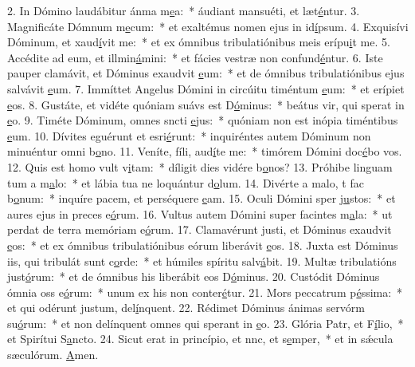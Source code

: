 2. In Dómino laudábitur ánma m\uline{e}a:~* áudiant mansuéti, et læt\uline{é}ntur.
3. Magnificáte Dómnum m\uline{e}cum:~* et exaltémus nomen ejus in id\uline{í}psum.
4. Exquisívi Dóminum, et xaud\uline{í}vit me:~* et ex ómnibus tribulatiónibus meis erípu\uline{i}t me.
5. Accédite ad eum, et illmin\uline{á}mini:~* et fácies vestræ non confund\uline{é}ntur.
6. Iste pauper clamávit, et Dóminus exaudvit \uline{e}um:~* et de ómnibus tribulatiónibus ejus salvávit \uline{e}um.
7. Immíttet Angelus Dómini in circúitu timéntum \uline{e}um:~* et erípiet \uline{e}os.
8. Gustáte, et vidéte quóniam suávs est D\uline{ó}minus:~* beátus vir, qui sperat in \uline{e}o.
9. Timéte Dóminum, omnes sncti \uline{e}jus:~* quóniam non est inópia timéntibus \uline{e}um.
10. Dívites eguérunt et esri\uline{é}runt:~* inquiréntes autem Dóminum non minuéntur omni b\uline{o}no.
11. Veníte, fíli, aud\uline{í}te me:~* timórem Dómini doc\uline{é}bo vos.
12. Quis est homo  vult v\uline{i}tam:~* díligit dies vidére b\uline{o}nos?
13. Próhibe linguam tum a m\uline{a}lo:~* et lábia tua ne loquántur d\uline{o}lum.
14. Divérte a malo, t fac b\uline{o}num:~* inquíre pacem, et perséquere \uline{e}am.
15. Oculi Dómini sper j\uline{u}stos:~* et aures ejus in preces e\uline{ó}rum.
16. Vultus autem Dómini super facintes m\uline{a}la:~* ut perdat de terra memóriam e\uline{ó}rum.
17. Clamavérunt justi, et Dóminus exaudvit \uline{e}os:~* et ex ómnibus tribulatiónibus eórum liberávit \uline{e}os.
18. Juxta est Dóminus iis, qui tribulát sunt c\uline{o}rde:~* et húmiles spíritu salv\uline{á}bit.
19. Multæ tribulatións just\uline{ó}rum:~* et de ómnibus his liberábit eos D\uline{ó}minus.
20. Custódit Dóminus ómnia oss e\uline{ó}rum:~* unum ex his non conter\uline{é}tur.
21. Mors peccatrum p\uline{é}ssima:~* et qui odérunt justum, del\uline{í}nquent.
22. Rédimet Dóminus ánimas servórm su\uline{ó}rum:~* et non delínquent omnes qui sperant in \uline{e}o.
23. Glória Patr, et F\uline{í}lio,~* et Spirítui S\uline{a}ncto.
24. Sicut erat in princípio, et nnc, et s\uline{e}mper,~* et in sǽcula sæculórum. \uline{A}men.
